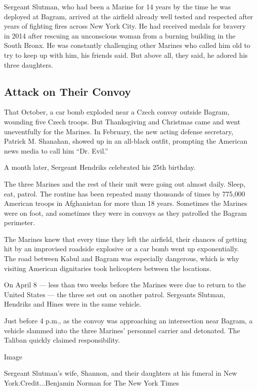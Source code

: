 Sergeant Slutman, who had been a Marine for 14 years by the time he was
deployed at Bagram, arrived at the airfield already well tested and
respected after years of fighting fires across New York City. He had
received medals for bravery in 2014 after rescuing an unconscious woman
from a burning building in the South Bronx. He was constantly
challenging other Marines who called him old to try to keep up with him,
his friends said. But above all, they said, he adored his three
daughters.

\hypertarget{attack-on-their-convoy}{%
\subsection{Attack on Their Convoy}\label{attack-on-their-convoy}}

That October, a car bomb exploded near a Czech convoy outside Bagram,
wounding five Czech troops. But Thanksgiving and Christmas came and went
uneventfully for the Marines. In February, the new acting defense
secretary, Patrick M. Shanahan, showed up in an all-black outfit,
prompting the American news media to call him ``Dr. Evil.''

A month later, Sergeant Hendriks celebrated his 25th birthday.

The three Marines and the rest of their unit were going out almost
daily. Sleep, eat, patrol. The routine has been repeated many thousands
of times by 775,000 American troops in Afghanistan for more than 18
years. Sometimes the Marines were on foot, and sometimes they were in
convoys as they patrolled the Bagram perimeter.

The Marines knew that every time they left the airfield, their chances
of getting hit by an improvised roadside explosive or a car bomb went up
exponentially. The road between Kabul and Bagram was especially
dangerous, which is why visiting American dignitaries took helicopters
between the locations.

On April 8 --- less than two weeks before the Marines were due to return
to the United States --- the three set out on another patrol. Sergeants
Slutman, Hendriks and Hines were in the same vehicle.

Just before 4 p.m., as the convoy was approaching an intersection near
Bagram, a vehicle slammed into the three Marines' personnel carrier and
detonated. The Taliban quickly claimed responsibility.

Image

Sergeant Slutman's wife, Shannon, and their daughters at his funeral in
New York.Credit...Benjamin Norman for The New York Times

